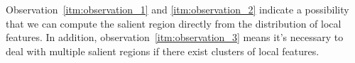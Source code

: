 Observation~\ref{itm:observation_1} and \ref{itm:observation_2} indicate a possibility that we can compute the salient region directly from the distribution of local features. In addition, observation~\ref{itm:observation_3} means it's necessary to deal with multiple salient regions if there exist clusters of local features.
